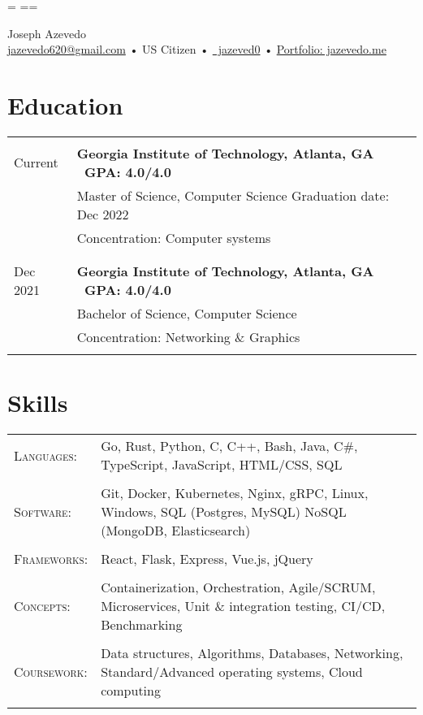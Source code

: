 \documentclass[a4paper,11pt]{article}
\newenvironment{rsection}[1]
  {
    \section{#1}
    \begin{tabular}{>{\raggedleft\arraybackslash}p{\lcolwidth}|p{\rcolwidth}}
   } {
    \\\multicolumn{2}{c}{} \\[-10pt]
    \end{tabular}
  }
\newcommand{\rheader}[2]{
    \multirow[t]{2}{*}{
        \begin{minipage}[t]{\dimexpr \lcolwidth - 0.1cm}
            \begin{flushright}
                \textsc{#1}
            \end{flushright}
        \end{minipage}
    } & \textbf{#2}
}
\newcommand{\rline}[1]{\\& #1}
\newcommand{\ritem}[2][ •\hspace{3pt}]{\\[-2pt]& \footnotesize{#1#2}}
\newenvironment{rskills}[1][Skills]
  {
    \section{#1}
    \begin{tabular}{>{\raggedleft\arraybackslash}p{\lcolwidth}p{\rcolwidth}}
    } {
    \end{tabular}
  }
\newcommand{\rskill}[2]{\textsc{#1}:& \small #2 \\ & \\[-14pt]}
\newcommand{\rskip}{\\\multicolumn{2}{c}{} \\[\subsectionvspace]}
\newcommand{\rdot}{\xspace\hspace{0pt}•\hspace{3pt}\xspace}
\begin{document}
\hsize=\hlinewidth \vsize=11in
\hoffset=\pagehoffset \voffset=\pagevoffset
\pdfpagewidth=8.5in
\pdfpageheight=11in
\pagestyle{empty}

\newcommand{\at}{@}
\newcommand{\gmaildotcom}{gmail.com}

\newcommand{\phoneandrdot}{\xspace}

\begin{center}
     \Huge       Joseph Azevedo
  \\[2pt] \normalsize \href{mailto:jazevedo620\at\gmaildotcom}{jazevedo620\at\gmaildotcom}
    \rdot US Citizen \rdot \phoneandrdot
\href{https://github.com/jazeved0}{\faGithub\ jazeved0} \rdot
    \href{https://jazevedo.me}{Portfolio: jazevedo.me} \\[6pt]
\end{center}
\vspace{\dimexpr \sectionvspace + 15pt}


\begin{rsection}{Education}
  \rheader{Jan 2022 -\\[-1pt] Current}{Georgia Institute of Technology,
    {\normalfont Atlanta, GA \hfill\  GPA: 4.0/4.0\ }}
  \rline{Master of Science, Computer Science \hfill Graduation date: Dec 2022}
  \vspace{2pt}
  \ritem[]{Concentration: Computer systems}
  \rskip
  \rheader{Jun 2018 -\\[-1pt] Dec 2021}{Georgia Institute of Technology,
    {\normalfont Atlanta, GA \hfill\  GPA: 4.0/4.0\ }}
  \rline{Bachelor of Science, Computer Science}
  \vspace{2pt}
  \ritem[]{Concentration: Networking \& Graphics}
\end{rsection}
\vspace{\sectionvspace}


\begin{rskills}
  \rskill{Languages}  {Go, Rust, Python, C, C++, Bash, Java, C\#,
                      TypeScript, JavaScript, HTML/CSS, SQL}
  \rskill{Software}   {Git, Docker, Kubernetes, Nginx, gRPC, Linux, Windows, SQL (Postgres, MySQL)
                      NoSQL (MongoDB, Elasticsearch)}
  \rskill{Frameworks} {React, Flask, Express, Vue.js, jQuery}
  \rskill{Concepts}   {Containerization, Orchestration, Agile/SCRUM, Microservices,
                      Unit \& integration testing, CI/CD, Benchmarking}
  \rskill{Coursework} {Data structures, Algorithms, Databases, Networking,
                      Standard/Advanced operating systems, Cloud computing}
\end{rskills}
\vspace{\dimexpr \sectionvspace + 11pt}
\end{document}

